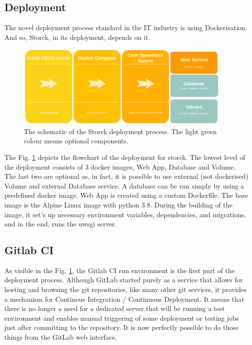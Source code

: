 \subsection{Deployment}

The novel deployment process standard in the IT industry is using Dockerisation.
And so, Storck, in its deployment, depends on it.

\begin{figure}[H]
\centering
\includegraphics[width=0.95\textwidth]{figures/chapter5/storck/storck_dockers.drawio.png}
\caption{The schematic of the Storck deployment process. The light green colour means optional components.}
\label{fig:storck-dockers}
\end{figure}

The Fig. \ref{fig:storck-dockers} depicts the flowchart of the deployment for storck.
The lowest level of the deployment consists of 3 docker images, Web App, Database and Volume.
The last two are optional as, in fact, it is possible to use external (not dockerised) Volume and external Database service.
A database can be run simply by using a predefined docker image.
Web App is created using a custom Dockerfile.
The base image is the Alpine Linux image with python 3.8.
During the building of the image, it set's up necessary environment variables, dependencies, and migrations, and in the end, runs the uwsgi server.

\subsection{Gitlab CI}

As visible in the Fig. \ref{fig:storck-dockers}, the Gitlab CI run environment is the first part of the deployment process.
Although GitLab started purely as a service that allows for hosting and browsing the git repositories, like many other git services, it provides a mechanism for Continous Integration / Continuous Deployment.
It means that there is no longer a need for a dedicated server that will be running a test environment and enables manual triggering of some deployment or testing jobs just after committing to the repository.
It is now perfectly possible to do those things from the GitLab web interface.

